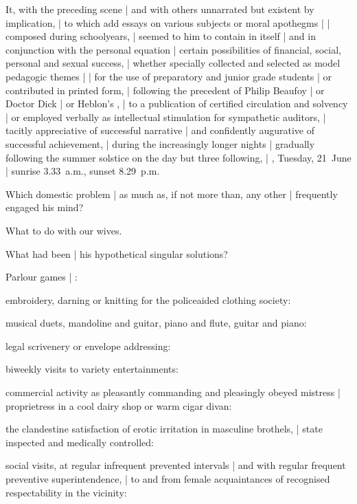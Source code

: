 \Memories
It, with the preceding scene |
and with others unnarrated but existent by implication, |
to which add essays on various subjects or moral apothegms |
 |
composed during schoolyears, |
seemed to him to contain in itself |
and in conjunction with the personal equation |
certain possibilities of financial, social, personal and sexual success, |
whether specially collected and selected as model pedagogic themes |
 |
for the use of preparatory and junior grade students |
or contributed in printed form, |
following the precedent of Philip Beaufoy |
or Doctor Dick |
or Heblon's , |
to a publication of certified circulation and solvency |
or employed verbally as intellectual stimulation for sympathetic auditors, |
tacitly appreciative of successful narrative |
and confidently augurative of successful achievement, |
during the increasingly longer nights |
gradually following the summer solstice on the day but three following, |
, Tuesday, 21~June
 |
sunrise 3.33~a.m., sunset 8.29~p.m.


Which domestic problem |
as much as, if not more than, any other |
frequently engaged his mind?

\Philosophy
What to do with our wives.


What had been |
his hypothetical singular solutions?%

\Factual
Parlour games |
:

\Science
embroidery, darning or knitting for the policeaided clothing society:

\Religious
musical duets, mandoline and guitar, piano and flute, guitar and piano:

\Philosophy
legal scrivenery or envelope addressing:

\Poetry
biweekly visits to variety entertainments:

\Places
commercial activity as pleasantly commanding and pleasingly obeyed mistress |
proprietress in a cool dairy shop or warm cigar divan:

\Household
the clandestine satisfaction of erotic irritation in masculine brothels, |
state inspected and medically controlled:

\Memories
social visits,
at regular infrequent prevented intervals |
and with regular frequent preventive superintendence, |
to and from female acquaintances of recognised respectability in the vicinity:

